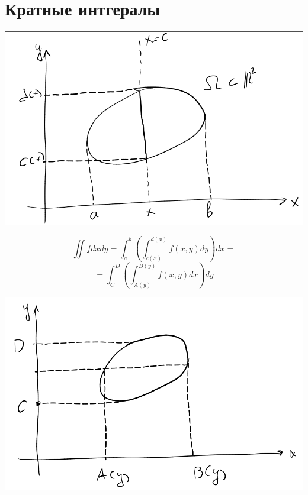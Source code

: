 \documentclass[english]{article}
\theoremstyle{plain}
\theoremstyle{remark}
\theoremstyle{definition}
\begin{document}
\section{Кратные интгералы}
\label{sec:org4178292}
\begin{center}
\includegraphics[scale=0.35]{2_1.png}
\end{center}
\[ \iint f dx dy = \int^b_a\left(\int^{d(x)}_{c(x)} f(x, y) dy\right)dx = \]
\[ = \int_C^D\left(\int_{A(y)}^{B(y)}f(x, y) dx\right)dy \]
\begin{center}
\includegraphics[scale=0.35]{2_2.png}
\end{center}
\end{document}
